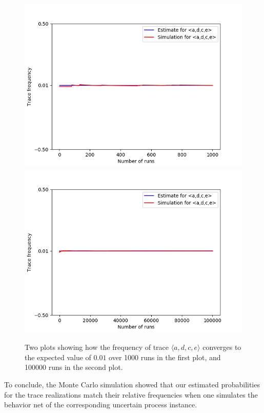 \begin{figure}%
    \centering
    {{\includegraphics[width=12cm]{figures/adce1.png} }}%
    \qquad
    {{\includegraphics[width=12cm]{figures/adce100.png} }}%
    \caption{Two plots showing how the frequency of trace $\langle a,d,c,e \rangle$ converges to the expected value of $0.01$ over 1000 runs in the first plot, and 100000 runs in the second plot.}%
    \label{fig: adce}%
\end{figure}
%
%
%
%
%
To conclude, the Monte Carlo simulation showed that our estimated probabilities for the trace realizations match their relative frequencies when one simulates the behavior net of the corresponding uncertain process instance.

%
%
%
%
